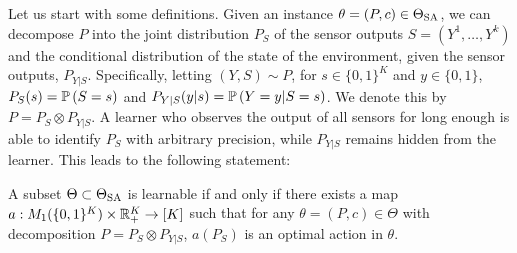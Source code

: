 Let us start with some definitions.
Given an instance $\theta = (P,c)\in \Theta_{\mathrm{SA}}$, we can decompose $P$ into the joint distribution $P_S$ of the sensor outputs $S = (Y^1,\dots,Y^k)$ and the conditional distribution of the state of the environment, given the sensor outputs, $P_{Y|S}$.
Specifically, letting $(Y,S)\sim P$, for $s\in \{0,1\}^K$ and $y\in \{0,1\}$, $P_S(s) = \mathbb{P}\left(S = s\right)$ and $P_{Y|S}(y|s) = \mathbb{P}\left(Y=y|S=s\right)$. We denote this by $P = P_S \otimes P_{Y|S}$.
A learner who observes the output of all sensors for long enough is able to identify 
$P_S$ with arbitrary precision, while $P_{Y|S}$ remains hidden from the learner.
 This leads to the following statement:
\begin{prop}
\label{prop:learnablemap}
A subset $\Theta\subset \Theta_{\mathrm{SA}}$ is learnable 
if and only if there exists a map $a: M_1( \{0,1\}^K )\times \mathbb{R}_+^K \to [K]$ such that 
for any $\theta= (P,c)\in \Theta$ 
with decomposition $P = P_S \otimes P_{Y|S}$, $a(P_S)$ is an optimal action in $\theta$.
\end{prop}
